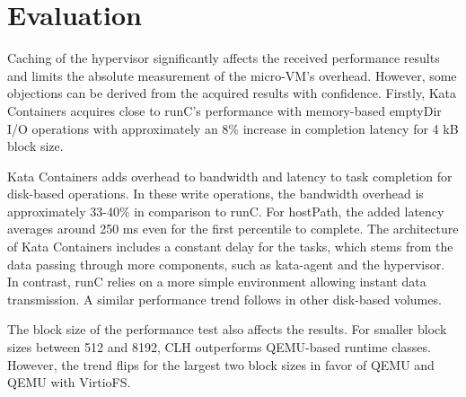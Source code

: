 \section{Evaluation}

Caching of the hypervisor significantly affects the received performance results and limits the absolute measurement of the micro-VM's overhead. However, some objections can be derived from the acquired results with confidence. Firstly, Kata Containers acquires close to runC's performance with memory-based emptyDir I/O operations with approximately an 8\% increase in completion latency for 4 kB block size. 

Kata Containers adds overhead to bandwidth and latency to task completion for disk-based operations. In these write operations, the bandwidth overhead is approximately 33-40\% in comparison to runC. For hostPath, the added latency averages around 250 ms even for the first percentile to complete. The architecture of Kata Containers includes a constant delay for the tasks, which stems from the data passing through more components, such as kata-agent and the hypervisor. In contrast, runC relies on a more simple environment allowing instant data transmission. A similar performance trend follows in other disk-based volumes.

The block size of the performance test also affects the results. For smaller block sizes between 512 and 8192, CLH outperforms QEMU-based runtime classes. However, the trend flips for the largest two block sizes in favor of QEMU and QEMU with VirtioFS.

